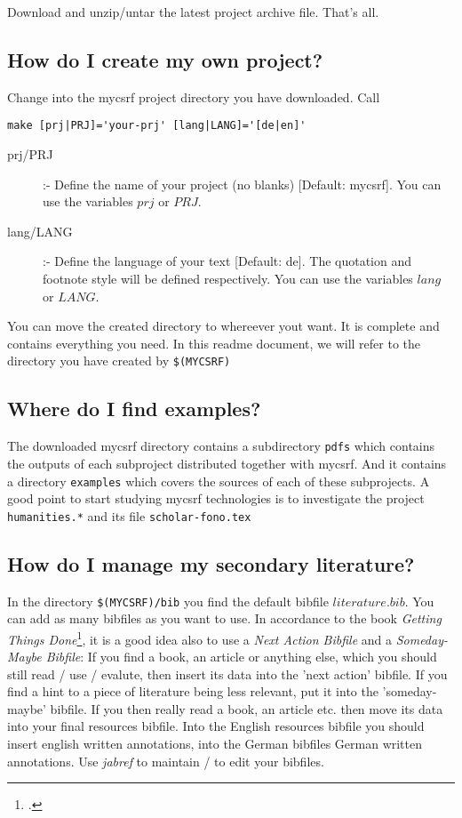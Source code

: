 \documentclass[
  DIV=calc,
  BCOR=5mm,
  11pt,
  headings=small,
  oneside,
  abstract=true,
  toc=bib,
  ngerman,english]{scrartcl}
\begin{document}
Download and unzip/untar the latest project archive file. That's all.

\subsection{How do I create my own project?}

Change into the mycsrf project directory you have downloaded. Call
\begin{verbatim}
make [prj|PRJ]='your-prj' [lang|LANG]='[de|en]'
\end{verbatim}

\begin{description}	
  \item [prj/PRJ] :- Define the name of your project (no blanks) [Default: mycsrf]. 
  You can use the variables $prj$ or $PRJ$.
  \item [lang/LANG] :- Define the language of your text [Default: de]. The quotation
  and footnote style will be defined respectively. You can use the variables 
  $lang$ or $LANG$.
\end{description}

You can move the created directory to whereever yout want. It is complete and
contains everything you need. In this readme document, we will refer to the directory
you have created by \texttt{\$(MYCSRF)}

\subsection{Where do I find examples?}

The downloaded mycsrf directory contains a subdirectory \texttt{pdfs} which
contains the outputs of each subproject distributed together with mycsrf. And it
contains a directory \texttt{examples} which covers the sources of each of these
subprojects. A good point to start studying mycsrf technologies is to
investigate the project \texttt{humanities.*} and its file
\texttt{scholar-fono.tex}
 
\subsection{How do I manage my secondary literature?}
In the directory \texttt{\$(MYCSRF)/bib} you find the default bibfile $literature.bib$.
You can add as many bibfiles as you want to use. In accordance to the book
\textit{Getting Things Done}\footcite[cf.][36 et passim]{Allen2001a}, it is a
good idea also to use a \textit{Next Action Bibfile} and a
\textit{Someday-Maybe Bibfile}: If you find a book, an article or anything else,
which you should still read / use / evalute, then insert its data into the 'next
action' bibfile. If you find a hint to a piece of literature being less
relevant, put it into the 'someday-maybe' bibfile. If you then really read a
book, an article etc. then move its data into your final resources bibfile.
Into the English resources bibfile you should insert english written
annotations, into the German bibfiles German written annotations. Use
\textit{jabref} to maintain / to edit your bibfiles.
\end{document}
